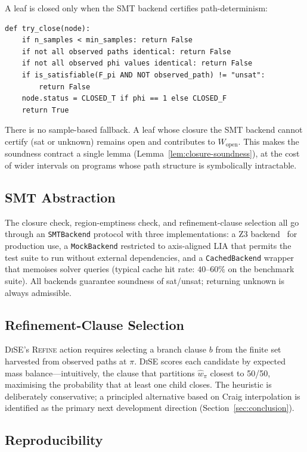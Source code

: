 \documentclass[runningheads]{llncs}
\providecommand{\Cref}[1]{Section~\ref{#1}}
\newcommand{\Wopen}{W_{\mathrm{open}}}
\newcommand{\hwhat}{\hat{w}}
\newcommand{\unsat}{\textsf{unsat}}
\newcommand{\sat}{\textsf{sat}}
\newcommand{\unknown}{\textsf{unknown}}
\newcommand{\toolname}{\textsc{DiSE}}
\newcommand{\code}[1]{\texttt{#1}}
\begin{document}
A leaf is closed only when the SMT backend certifies
path-determinism:
\begin{verbatim}
def try_close(node):
    if n_samples < min_samples: return False
    if not all observed paths identical: return False
    if not all observed phi values identical: return False
    if is_satisfiable(F_pi AND NOT observed_path) != "unsat":
        return False
    node.status = CLOSED_T if phi == 1 else CLOSED_F
    return True
\end{verbatim}
There is no sample-based fallback.  A leaf whose closure the SMT
backend cannot certify (\sat{} or \unknown{}) remains open and
contributes to $\Wopen$.  This makes the soundness contract a single
lemma (Lemma~\ref{lem:closure-soundness}), at the cost of wider
intervals on programs whose path structure is symbolically
intractable.

\subsection{SMT Abstraction}\label{sec:smt}

The closure check, region-emptiness check, and refinement-clause
selection all go through an \code{SMTBackend} protocol with three
implementations: a Z3 backend~\cite{demoura2008z3} for production use,
a \code{MockBackend} restricted to axis-aligned LIA that permits the
test suite to run without external dependencies, and a
\code{CachedBackend} wrapper that memoises solver queries (typical
cache hit rate: $40$--$60\%$ on the benchmark suite).  All backends
guarantee soundness of \sat/\unsat{}; returning \unknown{} is always
admissible.

\subsection{Refinement-Clause Selection}\label{sec:clause-selection}

\toolname{}'s \textsc{Refine} action requires selecting a branch clause
$b$ from the finite set harvested from observed paths at $\pi$.
\toolname{} scores each candidate by expected mass balance---intuitively,
the clause that partitions $\hwhat_\pi$ closest to 50/50, maximising
the probability that at least one child closes.  The heuristic is
deliberately conservative; a principled alternative based on Craig
interpolation is identified as the primary next development direction
(\Cref{sec:conclusion}).

\subsection{Reproducibility}\label{sec:repro}
\end{document}
